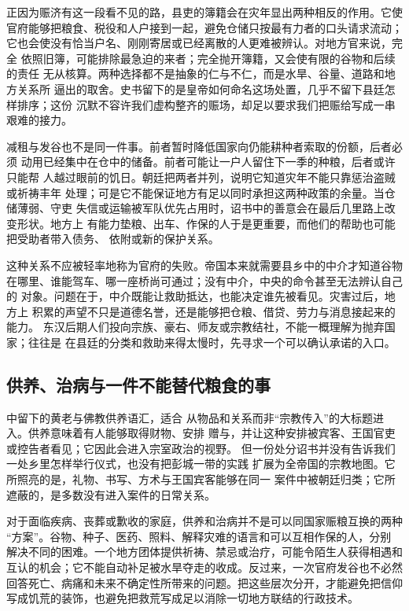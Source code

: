 正因为赈济有这一段看不见的路，县吏的簿籍会在灾年显出两种相反的作用。它使
官府能够把粮食、税役和人户接到一起，避免仓储只按最有力者的口头请求流动；
它也会使没有恰当户名、刚刚寄居或已经离散的人更难被辨认。对地方官来说，完全
依照旧簿，可能排除最急迫的来者；完全抛开簿籍，又会使有限的谷物和后续的责任
无从核算。两种选择都不是抽象的仁与不仁，而是水旱、谷量、道路和地方关系所
逼出的取舍。史书留下的是皇帝如何命名这场处置，几乎不留下县廷怎样排序；这份
沉默不容许我们虚构整齐的赈场，却足以要求我们把赈给写成一串艰难的接力。

减租与发谷也不是同一件事。前者暂时降低国家向仍能耕种者索取的份额，后者必须
动用已经集中在仓中的储备。前者可能让一户人留住下一季的种粮，后者或许只能帮
人越过眼前的饥日。朝廷把两者并列，说明它知道灾年不能只靠惩治盗贼或祈祷丰年
处理；可是它不能保证地方有足以同时承担这两种政策的余量。当仓储薄弱、守吏
失信或运输被军队优先占用时，诏书中的善意会在最后几里路上改变形状。地方上
有能力垫粮、出车、作保的人于是更重要，而他们的帮助也可能把受助者带入债务、
依附或新的保护关系。

这种关系不应被轻率地称为官府的失败。帝国本来就需要县乡中的中介才知道谷物
在哪里、谁能驾车、哪一座桥尚可通过；没有中介，中央的命令甚至无法辨认自己的
对象。问题在于，中介既能让救助抵达，也能决定谁先被看见。灾害过后，地方上
积累的声望不只是道德名誉，还是能够把仓粮、借贷、劳力与消息接起来的能力。
东汉后期人们投向宗族、豪右、师友或宗教结社，不能一概理解为抛弃国家；往往是
在县廷的分类和救助来得太慢时，先寻求一个可以确认承诺的入口。

\subsection{供养、治病与一件不能替代粮食的事}

中留下的黄老与佛教供养语汇，适合
从物品和关系而非“宗教传入”的大标题进入。供养意味着有人能够取得财物、安排
赠与，并让这种安排被宾客、王国官吏或控告者看见；它因此会进入宗室政治的视野。
但一份处分诏书并没有告诉我们一处乡里怎样举行仪式，也没有把彭城一带的实践
扩展为全帝国的宗教地图。它所照亮的是，礼物、书写、方术与王国宾客能够在同一
案件中被朝廷归类；它所遮蔽的，是多数没有进入案件的日常关系。

对于面临疾病、丧葬或歉收的家庭，供养和治病并不是可以同国家赈粮互换的两种
“方案”。谷物、种子、医药、照料、解释灾难的语言和可以互相作保的人，分别
解决不同的困难。一个地方团体提供祈祷、禁忌或治疗，可能令陌生人获得相遇和
互认的机会；它不能自动补足被水旱夺走的收成。反过来，一次官府发谷也不必然
回答死亡、病痛和未来不确定性所带来的问题。把这些层次分开，才能避免把信仰
写成饥荒的装饰，也避免把救荒写成足以消除一切地方联结的行政技术。

